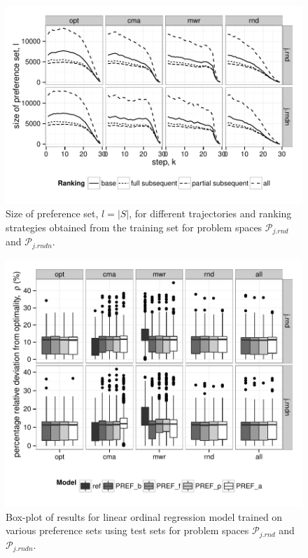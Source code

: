 \documentclass[smallextended]{llncs}
\begin{document}
\begin{figure} \centering
\includegraphics[width=\columnwidth]{figures/numTrainingData}
\caption{Size of preference set, $l=|S|$, for different trajectories and ranking strategies obtained from the training set for problem spaces $\mathcal{P}_{j.rnd}$ and $\mathcal{P}_{j.rndn}$.}
\label{fig:sizeofprefset}
\end{figure}


\begin{figure}[t]\centering 
\includegraphics[width=\columnwidth]{figures/boxplot} 
\caption{Box-plot of results for linear ordinal regression model trained on various preference sets using test sets for problem spaces $\mathcal{P}_{j.rnd}$ and $\mathcal{P}_{j.rndn}$.  }
\label{fig:results}
\end{figure}
 
\end{document}
